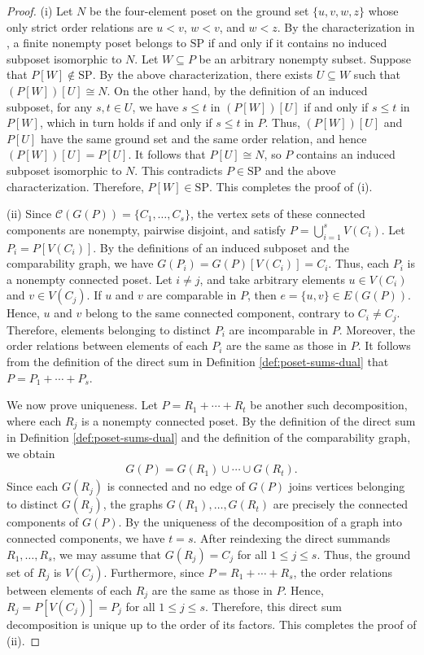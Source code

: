\documentclass[10pt,a4paper]{amsart}
\begin{document}
\begin{proof}
\textup{(i)}
Let $N$ be the four-element poset on the ground set $\{u,v,w,z\}$
whose only strict order relations are $u<v$, $w<v$, and $w<z$.
By the characterization in \cite{Valdes1981},
a finite nonempty poset belongs to $\mathrm{SP}$ if and only if
it contains no induced subposet isomorphic to $N$.
Let $W\subseteq P$ be an arbitrary nonempty subset.
Suppose that $P[W]\notin\mathrm{SP}$.
By the above characterization, there exists $U\subseteq W$
such that $(P[W])[U]\cong N$.
On the other hand, by the definition of an induced subposet,
for any $s,t\in U$, we have $s\le t$ in $(P[W])[U]$
if and only if $s\le t$ in $P[W]$, which in turn holds
if and only if $s\le t$ in $P$.
Thus, $(P[W])[U]$ and $P[U]$ have the same ground set
and the same order relation, and hence $(P[W])[U]=P[U]$.
It follows that $P[U]\cong N$, so $P$ contains an induced subposet isomorphic to $N$.
This contradicts $P\in\mathrm{SP}$ and the above characterization.
Therefore, $P[W]\in\mathrm{SP}$.
This completes the proof of \textup{(i)}.

\textup{(ii)}
Since $\mathcal C(G(P))=\{C_1,\ldots,C_s\}$,
the vertex sets of these connected components are nonempty,
pairwise disjoint, and satisfy $P=\bigcup_{i=1}^{s}V(C_i)$.
Let $P_i=P[V(C_i)]$.
By the definitions of an induced subposet and the comparability graph,
we have $G(P_i)=G(P)[V(C_i)]=C_i$.
Thus, each $P_i$ is a nonempty connected poset.
Let $i\neq j$, and take arbitrary elements $u\in V(C_i)$ and $v\in V(C_j)$.
If $u$ and $v$ are comparable in $P$, then $e=\{u,v\}\in E(G(P))$.
Hence, $u$ and $v$ belong to the same connected component, contrary to $C_i\neq C_j$.
Therefore, elements belonging to distinct $P_i$ are incomparable in $P$.
Moreover, the order relations between elements of each $P_i$ are the same as those in $P$.
It follows from the definition of the direct sum 
in Definition \ref{def:poset-sums-dual} that $P=P_1+\cdots+P_s$.

We now prove uniqueness.
Let $P=R_1+\cdots+R_t$ be another such decomposition,
where each $R_j$ is a nonempty connected poset.
By the definition of the direct sum in Definition \ref{def:poset-sums-dual}
and the definition of the comparability graph, we obtain
\begin{eqnarray*}
G(P)=G(R_1)\cup\cdots\cup G(R_t).
\end{eqnarray*}
Since each $G(R_j)$ is connected and no edge of $G(P)$ joins vertices belonging to distinct $G(R_j)$,
the graphs $G(R_1),\ldots,G(R_t)$ are precisely the connected components of $G(P)$.
By the uniqueness of the decomposition of a graph into connected components, we have $t=s$.
After reindexing the direct summands $R_1,\ldots,R_s$,
we may assume that $G(R_j)=C_j$ for all $1\leq j\leq s$.
Thus, the ground set of $R_j$ is $V(C_j)$.
Furthermore, since $P=R_1+\cdots+R_s$,
the order relations between elements of each $R_j$ are the same as those in $P$.
Hence, $R_j=P[V(C_j)]=P_j$ for all $1\leq j\leq s$.
Therefore, this direct sum decomposition is unique up to the order of its factors.
This completes the proof of \textup{(ii)}.


\end{proof}
\end{document}
